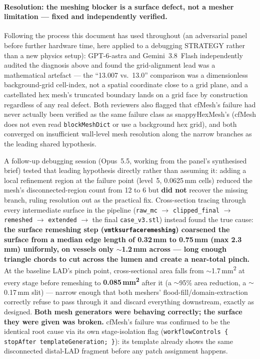 \documentclass[11pt]{article}
\begin{document}
\paragraph{Resolution: the meshing blocker is a surface defect, not a mesher limitation --- fixed and
independently verified.} Following the process this document has used throughout (an adversarial panel
before further hardware time, here applied to a debugging STRATEGY rather than a new physics setup):
GPT-6-astra and Gemini~3.8~Flash independently audited the diagnosis above and found the grid-alignment
lead was a mathematical artefact --- the ``13.007 vs.\ 13.0'' comparison was a dimensionless
background-grid cell-index, not a spatial coordinate close to a grid plane, and a castellated hex mesh's
truncated boundary lands on a grid face by construction regardless of any real defect. Both reviewers
also flagged that cfMesh's failure had never actually been verified as the same failure class as
snappyHexMesh's (cfMesh does not even read \texttt{blockMeshDict} or use a background hex grid), and
both converged on insufficient wall-level mesh resolution along the narrow branches as the leading
shared hypothesis.

A follow-up debugging session (Opus~5.5, working from the panel's synthesised brief) tested that leading
hypothesis directly rather than assuming it: adding a local refinement region at the failure point
(level~5, 0.0625\,mm cells) reduced the mesh's disconnected-region count from 12 to 6 but \textbf{did
not} recover the missing branch, ruling resolution out as the practical fix. Cross-section tracing
through every intermediate surface in the pipeline (\texttt{raw\_\allowbreak{}mc} $\to$ \texttt{clipped\_\allowbreak{}final} $\to$
\texttt{remeshed} $\to$ \texttt{extended} $\to$ the final \texttt{case\_\allowbreak{}v3.stl}) instead found the true
cause: \textbf{the surface remeshing step (\texttt{vmtksurfaceremeshing}) coarsened the surface from a
median edge length of 0.32\,mm to 0.75\,mm (max 2.3\,mm) uniformly, on vessels only $\sim$1.2\,mm across
--- long enough triangle chords to cut across the lumen and create a near-total pinch.} At the baseline
LAD's pinch point, cross-sectional area falls from $\sim$1.7\,mm\textsuperscript{2} at every stage before
remeshing to \textbf{0.085\,mm\textsuperscript{2}} after it (a $\sim$95\% area reduction, a $\sim$0.17\,mm
slit) --- narrow enough that both meshers' flood-fill/domain-extraction correctly refuse to pass through
it and discard everything downstream, exactly as designed. \textbf{Both mesh generators were behaving
correctly; the surface they were given was broken.} cfMesh's failure was confirmed to be the identical
root cause via its own stage-isolation flag (\texttt{workflowControls \{ stopAfter templateGeneration; \}}):
its template already shows the same disconnected distal-LAD fragment before any patch assignment happens.
\end{document}
